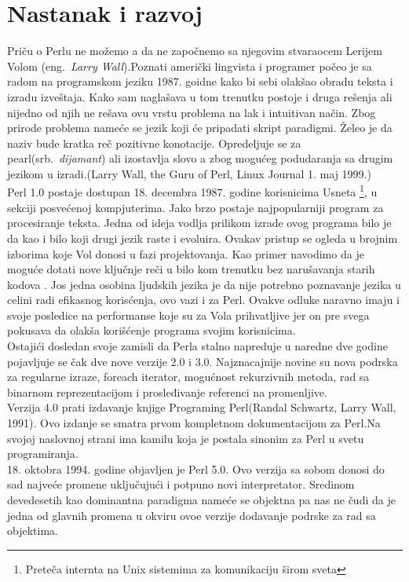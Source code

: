 \documentclass[12pt]{article}
\begin{document}
\section{Nastanak i razvoj}

Priču o Perlu ne možemo a da ne započnemo sa njegovim stvaraocem Lerijem Volom (eng.~{\em Larry Wall}).Poznati američki lingvista i programer počeo je sa radom na programskom jeziku 1987. goidne kako bi sebi olakšao obradu teksta i izradu izveštaja. Kako sam naglašava u tom trenutku postoje i druga rešenja ali nijedno od njih ne rešava ovu vrstu problema na lak i intuitivan način. Zbog prirode problema nameće se jezik koji će pripadati skript paradigmi. Želeo je da naziv bude kratka reč pozitivne konotacije. Opredeljuje se za pearl(srb.~{\em dijamant}) ali izostavlja slovo a zbog mogućeg podudaranja sa drugim jezikom u izradi.(Larry Wall, the Guru of Perl, Linux Journal 1. maj 1999.)\\
Perl 1.0 postaje dostupan 18. decembra 1987. godine korisnicima Usneta \footnote{Preteča internta na Unix sistemima za komunikaciju širom sveta}, u sekciji posvećenoj kompjuterima. Jako brzo postaje najpopularniji program za procesiranje teksta. Jedna od ideja vodlja prilikom izrade ovog programa bilo je da kao i bilo koji drugi jezik raste i evoluira. Ovakav pristup se ogleda u brojnim izborima koje Vol donosi u fazi projektovanja. Kao primer navodimo da je moguće  dotati nove ključnje reči u bilo kom trenutku bez narušavanja starih kodova \cite{id}. Jos jedna osobina ljudskih jezika je da nije potrebno poznavanje jezika u celini radi efikasnog korisćenja, ovo vazi i za Perl.  Ovakve odluke naravno imaju i svoje posledice na performanse koje su za Vola prihvatljive jer on pre svega pokusava da olakša korišćenje programa svojim korisnicima.\\
Ostajići dosledan svoje zamisli da Perla stalno napreduje u naredne dve godine pojavljuje se čak dve nove verzije 2.0 i 3.0. Najznacajnije novine su nova podrska za regularne izraze, foreach iterator, mogućnost rekurzivnih metoda, rad sa binarnom reprezentacijom i prosleđivanje referenci na promenljive\cite{patchnotes}.\\
Verzija 4.0 prati izdavanje knjige Programing Perl(Randal Schwartz, Larry Wall, 1991). Ovo izdanje se smatra prvom kompletnom dokumentacijom za Perl.Na svojoj naslovnoj strani ima kamilu koja je postala sinonim za Perl u svetu programiranja\cite{perlOrg}.\\
18. oktobra 1994. godine objavljen je Perl 5.0. Ovo verzija sa sobom donosi do sad najveće promene uključujući i potpuno novi interpretator. Sredinom devedesetih kao dominantna paradigma nameće se objektna pa nas ne čudi da je jedna od glavnih promena u okviru ovoe verzije dodavanje podrske za rad sa objektima.\\
\end{document}
